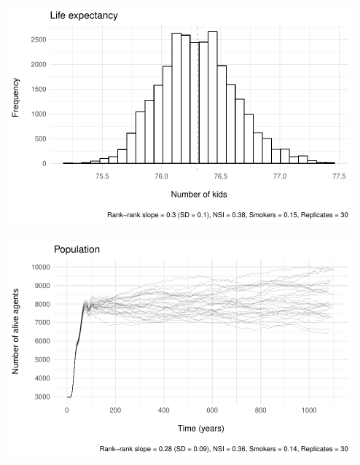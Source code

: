 \begin{figure}[htp]
     \begin{subfigure}[b]{0.4\textwidth}
         \centering
         \includegraphics[width=\textwidth]{plots/verification/population/le.pdf}
     \end{subfigure} %
     \begin{subfigure}[b]{0.4\textwidth}
         \centering
         \includegraphics[width=\textwidth]{plots/verification/population/population.pdf}
     \end{subfigure}
\end{figure}
